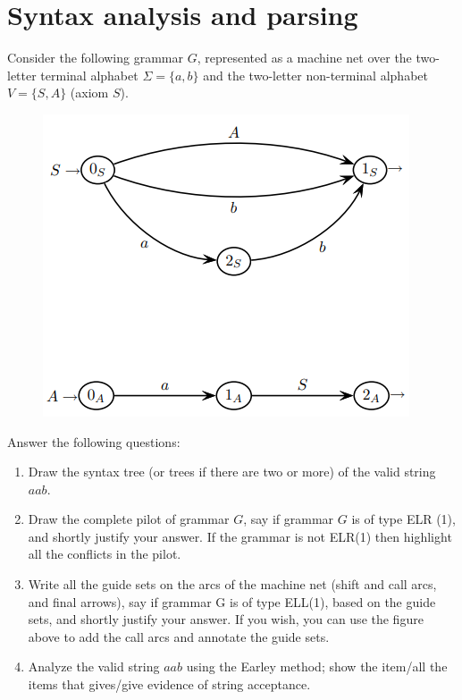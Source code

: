 \documentclass[12pt, a4paper]{report}
\newtheorem[style=M,bodystyle=\normalfont]{theorem}{Theorem}
\newtheorem[style=M,bodystyle=\normalfont]{corollary}{Corollary}
\newtheorem[style=M,bodystyle=\normalfont]{lemma}{Lemma}
\newtheorem[style=M,bodystyle=\normalfont]{definition}{Definition}
\begin{document}
    \section{Syntax analysis and parsing}
        Consider the following grammar $G$, represented as a machine net over the two-letter terminal alphabet $\Sigma = \{ a, b \}$ and the two-letter non-terminal alphabet 
        $V = \{ S, A \}$ (axiom $S$).
        \begin{figure}[H]
            \centering
            \includegraphics[width=0.5\linewidth]{images/parsing.png}
        \end{figure} 
        Answer the following questions:
        \begin{enumerate}
            \item Draw the syntax tree (or trees if there are two or more) of the valid string $a a b$.
            \item Draw the complete pilot of grammar $G$, say if grammar $G$ is of type ELR (1), and shortly justify your answer. If the grammar is not ELR(1) then highlight
                all the conflicts in the pilot.
            \item Write all the guide sets on the arcs of the machine net (shift and call arcs, and final arrows), say if grammar G is of type ELL(1), based on the guide sets, 
                and shortly justify your answer. If you wish, you can use the figure above to add the call arcs and annotate the guide sets.
            \item Analyze the valid string $a a b$ using the Earley method; show the item/all the items that gives/give evidence of string acceptance.
        \end{enumerate}
\end{document}
